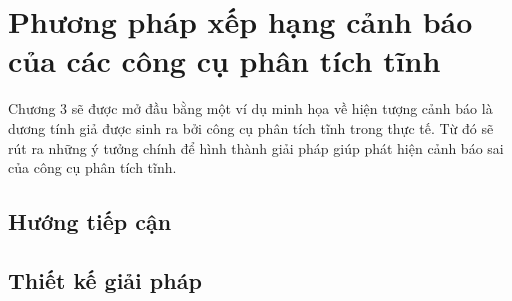\chapter{Phương pháp xếp hạng cảnh báo của các công cụ phân tích tĩnh}

Chương 3 sẽ được mở đầu bằng một ví dụ minh họa về hiện tượng cảnh báo là dương tính giả được sinh ra bởi công cụ phân tích tĩnh trong thực tế. Từ đó sẽ rút ra những ý tưởng chính để hình thành giải pháp giúp phát hiện cảnh báo sai của công cụ phân tích tĩnh. 



\section{Hướng tiếp cận}
\section{Thiết kế giải pháp}